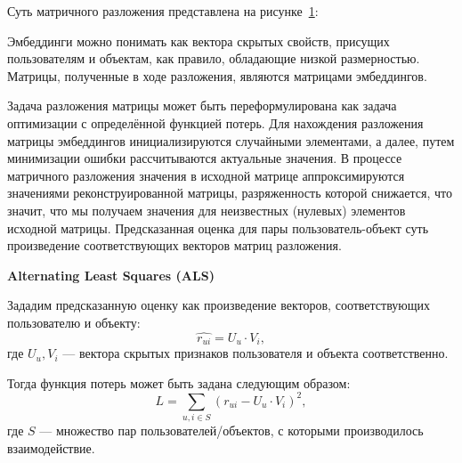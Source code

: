 Суть матричного разложения представлена на рисунке~\ref{fig:mf}:
\begin{figure}[h!]
\caption{}
\label{fig:mf}
\end{figure}

Эмбеддинги можно понимать как вектора скрытых свойств, присущих пользователям и объектам, как правило, обладающие низкой размерностью.
Матрицы, полученные в ходе разложения, являются матрицами эмбеддингов.

Задача разложения матрицы может быть переформулирована как задача оптимизации с определённой функцией потерь.
Для нахождения разложения матрицы эмбеддингов инициализируются случайными элементами, а далее, путем минимизации ошибки рассчитываются актуальные значения.
В процессе матричного разложения значения в исходной матрице аппроксимируются значениями реконструированной матрицы, разряженность которой снижается, что значит, что мы получаем значения для неизвестных (нулевых) элементов исходной матрицы.
Предсказанная оценка для пары пользователь-объект суть произведение соответствующих векторов матриц разложения.

\vspace{1em}
\textbf{Alternating Least Squares (ALS)}


Зададим предсказанную оценку как произведение векторов, соответствующих пользователю и объекту:
\begin{equation}\label{eq:1}
    \hat{r_{ui}} = U_{u} \cdot V_{i},
\end{equation}
где $U_{u}, V_{i}$ --- вектора скрытых признаков пользователя и объекта соответственно.

Тогда функция потерь может быть задана следующим образом:
\begin{equation}\label{eq:2}
        L = \sum_{u, i\in S}{(r_{ui} - U_{u} \cdot V_{i}) ^ 2},
\end{equation}
где $S$ --- множество пар пользователей/объектов, с которыми производилось взаимодействие.

